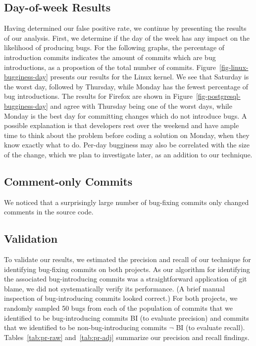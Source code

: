 \subsection{Day-of-week Results} Having determined our false positive rate, 
we continue by presenting the results of our analysis.  First, we
determine if the day of the week has any impact on the likelihood of
producing bugs. For the following graphs, the percentage of
introduction commits indicates the amount of commits which are bug
introductions, as a propostion of the total number of
commits. Figure~\ref{fig-linux-bugginess-day} presents our results for
the Linux kernel. We see that Saturday is the worst day, followed by Thursday,
while Monday has the fewest percentage of bug introductions. The
results for Firefox are shown in Figure~\ref{fig-postgresql-bugginess-day} and
agree with Thursday being one of the worst days, while Monday is the
best day for committing changes which do not introduce bugs. A
possible explanation is that developers rest over the weekend and have
ample time to think about the problem before coding a solution on
Monday, when they know exactly what to do. Per-day bugginess may also
be correlated with the size of the change, which we plan to investigate
later, as an addition to our technique.

\subsection{Comment-only Commits}
We noticed that a surprisingly large number of bug-fixing commits only 
changed comments in the source code.


\subsection{Validation} 
To validate our results, we estimated the precision and recall of our
technique for identifying bug-fixing commits on both projects.  As our
algorithm for identifying the associated bug-introducing commits was a
straightforward application of git blame, we did not systematically
verify its performance. (A brief manual inspection of bug-introducing
commits looked correct.) For both projects, we randomly sampled 50 bugs
from each of the population of commits that we identified to be
bug-introducing commits BI (to evaluate precision) and commits that we
identified to be non-bug-introducing commits $\neg$ BI (to evaluate recall).
Tables~\ref{tab:pr-raw} and~\ref{tab:pr-adj} summarize our precision and
recall findings.

